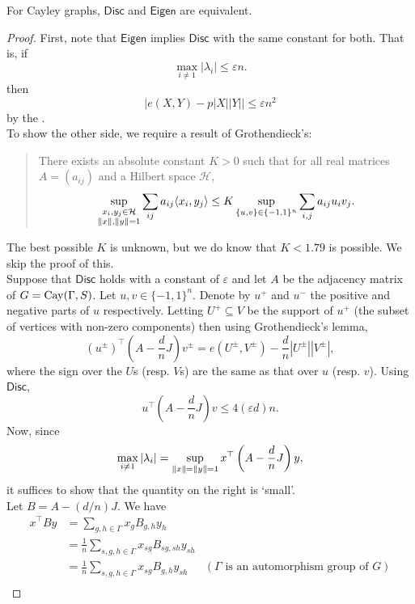 			\begin{ftheo}
				For Cayley graphs, $\mathsf{Disc}$ and $\mathsf{Eigen}$ are equivalent.
			\end{ftheo}
			\begin{proof}
				First, note that $\mathsf{Eigen}$ implies $\mathsf{Disc}$ with the same constant for both. That is, if
				\[  \max_{i\ne 1} |\lambda_i| \le \varepsilon n.  \]
				then
				\[ \left| e(X,Y) - p|X||Y| \right| \le \varepsilon n^2 \]
				by the .\\
				To show the other side, we require a result of Grothendieck's:
				\begin{quote}
					There exists an absolute constant $K > 0$ such that for all real matrices $A = (a_{ij})$ and a Hilbert space $\mathcal{H}$,
					\[ \sup_{\substack{x_i,y_j \in \mathcal{H} \\ \left\lVert x\right\rVert,\left\lVert y\right\rVert = 1}} \sum_{ij} a_{ij} \langle x_i , y_j \rangle \le K \sup_{\{u,v\}\in\{-1,1\}^n} \sum_{i,j} a_{ij} u_i v_j. \]
				\end{quote}
				The best possible $K$ is unknown, but we do know that $K < 1.79$ is possible. We skip the proof of this.\\
				Suppose that $\mathsf{Disc}$ holds with a constant of $\varepsilon$ and let $A$ be the adjacency matrix of $G = \operatorname{Cay}(\Gamma,S)$. Let $u,v\in\{-1,1\}^n$. Denote by $u^+$ and $u^-$ the positive and negative parts of $u$ respectively. Letting $U^+ \subseteq V$ be the support of $u^+$ (the subset of vertices with non-zero components) then using Grothendieck's lemma,
				\[ (u^\pm)^\top \left( A - \frac{d}{n} J \right) v^\pm = e(U^\pm,V^\pm) - \frac{d}{n} |U^\pm| |V^\pm|, \]
				where the sign over the $U$s (resp. $V$s) are the same as that over $u$ (resp. $v$). Using $\mathsf{Disc}$,
				\[ u^\top \left( A - \frac{d}{n}J \right) v \le 4(\varepsilon d)n. \]
				Now, since
				\[ \max_{i \ne 1} |\lambda_i| = \sup_{\left\lVert x\right\rVert = \left\lVert y\right\rVert = 1} x^\top \left(A - \frac{d}{n}J\right) y, \]
				it suffices to show that the quantity on the right is `small'.\\
				Let $B = A - (d/n)J$. We have
				\begin{align*}
					x^\top B y &= \sum_{g,h\in\Gamma} x_g B_{g,h} y_h \\
						&= \frac{1}{n} \sum_{s,g,h\in\Gamma} x_{sg} B_{sg,sh} y_{sh} \\
						&= \frac{1}{n} \sum_{s,g,h\in\Gamma} x_{sg} B_{g,h} y_{sh} & (\text{$\Gamma$ is an automorphism group of $G$}) \\

\end{align*}
\end{proof}
